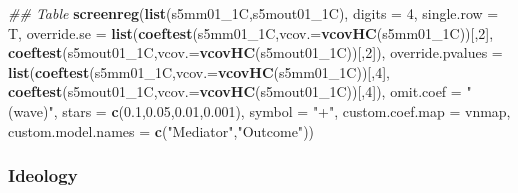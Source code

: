 \documentclass[
]{article}
\newenvironment{Shaded}{\begin{snugshade}}{\end{snugshade}}
\newcommand{\CommentTok}[1]{\textcolor[rgb]{0.56,0.35,0.01}{\textit{#1}}}
\newcommand{\DataTypeTok}[1]{\textcolor[rgb]{0.13,0.29,0.53}{#1}}
\newcommand{\DecValTok}[1]{\textcolor[rgb]{0.00,0.00,0.81}{#1}}
\newcommand{\FloatTok}[1]{\textcolor[rgb]{0.00,0.00,0.81}{#1}}
\newcommand{\KeywordTok}[1]{\textcolor[rgb]{0.13,0.29,0.53}{\textbf{#1}}}
\newcommand{\NormalTok}[1]{#1}
\newcommand{\StringTok}[1]{\textcolor[rgb]{0.31,0.60,0.02}{#1}}
\begin{document}
\begin{Shaded}
\begin{Highlighting}[]
\CommentTok{## Table}
\KeywordTok{screenreg}\NormalTok{(}\KeywordTok{list}\NormalTok{(s5mm01_1C,s5mout01_1C), }\DataTypeTok{digits =} \DecValTok{4}\NormalTok{, }\DataTypeTok{single.row =}\NormalTok{ T,}
          \DataTypeTok{override.se =} \KeywordTok{list}\NormalTok{(}\KeywordTok{coeftest}\NormalTok{(s5mm01_1C,}\DataTypeTok{vcov.=}\KeywordTok{vcovHC}\NormalTok{(s5mm01_1C))[,}\DecValTok{2}\NormalTok{],}
                             \KeywordTok{coeftest}\NormalTok{(s5mout01_1C,}\DataTypeTok{vcov.=}\KeywordTok{vcovHC}\NormalTok{(s5mout01_1C))[,}\DecValTok{2}\NormalTok{]),}
          \DataTypeTok{override.pvalues =} \KeywordTok{list}\NormalTok{(}\KeywordTok{coeftest}\NormalTok{(s5mm01_1C,}\DataTypeTok{vcov.=}\KeywordTok{vcovHC}\NormalTok{(s5mm01_1C))[,}\DecValTok{4}\NormalTok{],}
                                  \KeywordTok{coeftest}\NormalTok{(s5mout01_1C,}\DataTypeTok{vcov.=}\KeywordTok{vcovHC}\NormalTok{(s5mout01_1C))[,}\DecValTok{4}\NormalTok{]),}
          \DataTypeTok{omit.coef =} \StringTok{"(wave)"}\NormalTok{, }\DataTypeTok{stars =} \KeywordTok{c}\NormalTok{(}\FloatTok{0.1}\NormalTok{,}\FloatTok{0.05}\NormalTok{,}\FloatTok{0.01}\NormalTok{,}\FloatTok{0.001}\NormalTok{), }\DataTypeTok{symbol =} \StringTok{"+"}\NormalTok{,}
          \DataTypeTok{custom.coef.map =}\NormalTok{ vnmap, }
          \DataTypeTok{custom.model.names =} \KeywordTok{c}\NormalTok{(}\StringTok{"Mediator"}\NormalTok{,}\StringTok{"Outcome"}\NormalTok{))}
\end{Highlighting}
\end{Shaded}

\hypertarget{ideology}{%
\subsubsection{Ideology}\label{ideology}}
\end{document}
